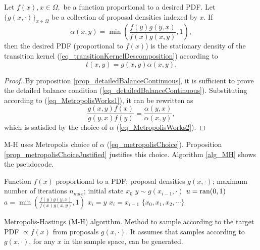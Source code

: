 \begin{proposition} \label{prop_metropolisChoiceJustified}
  Let $f(x), x\in\Omega,$ be a function proportional to a desired PDF. 
  Let $\{g(x,\cdot)\}_{x\in\Omega}$ be a collection of proposal densities indexed by $x$.
  If
  \begin{equation} \label{eq_MetropolisWorks2}
    \alpha(x,y) = \min\left( \frac{f(y)g(y,x)}{f(x)g(x,y)} , 1 \right),
  \end{equation}
  then the desired PDF (proportional to $f(x)$) is the stationary density of the transition kernel (\ref{eq_transitionKernelDescomposition}) according to 
  \begin{equation} \label{eq_MetropolisWorks1}
    t(x,y) = g(x,y)\alpha(x,y).
  \end{equation}
  \begin{proof}
    By proposition \ref{prop_detailedBalanceContinuous}, it is sufficient to prove the detailed balance condition (\ref{eq_detailedBalanceContinuous}). Substituting according to (\ref{eq_MetropolisWorks1}), it can be rewritten as
    $$
      \frac{g(x,y)f(x)}{g(y,x)f(y)} = \frac{\alpha(y,x)}{\alpha(x,y)},
    $$
    which is satisfied by the choice of $\alpha$ (\ref{eq_MetropolisWorks2}).
  \end{proof}
\end{proposition}

M-H uses Metropolis choice of $\alpha$ (\ref{eq_metropolisChoice}). Proposition \ref{prop_metropolisChoiceJustified} justifies this choice. Algorithm \ref{alg_MH} shows the pseudocode.

\vspace{5mm}
\begin{algorithm}[H]
\SetAlgoLined
   Function $f(x)$ proportional to a PDF; proposal densities $g(x,\cdot)$; maximum number of iterations $n_{max}$; initial state $x_0$\;
  {
    $y \sim g(x_{i-1},\cdot)$\;
    $u = \textup{ran}(0,1)$\;
    $a = \min\left( \frac{f(y)g(y,x)}{f(x)g(x,y)} , 1 \right)$\;
    {
      $x_i = y$\;
    }
    \Else
    {
      $x_i = x_{i-1}$\;
    }
  }
   $\{x_0,x_1,x_2,\cdots\}$\;
\caption[Metropolis-Hastings (M-H) algorithm]
{
  Metropolis-Hastings (M-H) algorithm. Method to sample according to the target PDF $\propto f(x)$ from proposals $g(x,\cdot)$. It assumes that samples according to $g(x,\cdot)$, for any $x$ in the sample space, can be generated.
}
\label{alg_MH}
\end{algorithm}
\vspace{5mm}

